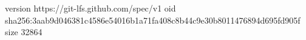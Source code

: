 version https://git-lfs.github.com/spec/v1
oid sha256:3aab9d046381c4586e54016b1a71fa408c8b44c9e30b8011476894d695fd905f
size 32864
